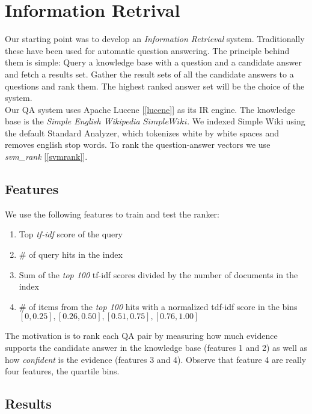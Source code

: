 \section{Information Retrival}
Our starting point was to develop an \emph{Information Retrieval} system. Traditionally these have been used for automatic question answering. The principle behind them is simple: Query a knowledge base with a question and a candidate answer and fetch a results set.  Gather the result sets of all the candidate answers to a questions and rank them. The highest ranked answer set will be the choice of the system.\\

Our QA system uses Apache Lucene [\ref{lucene}] as its IR engine. The knowledge base is the \emph{Simple English Wikipedia \(Simple Wiki\)}. We indexed Simple Wiki using the default Standard Analyzer, which tokenizes white by white spaces and removes english stop words. To rank the question-answer vectors we use \emph{svm\_rank} [\ref{svmrank}].

\subsection{Features}

We use the following features to train and test the ranker:

\begin{enumerate}
\item Top \emph{tf-idf} score of the query
\item \# of query hits in the index
\item Sum of the \emph{top 100} tf-idf scores divided by the number of documents in the index
\item \# of items from the \emph{top 100} hits with a normalized tdf-idf score in the bins $[0, 0.25], [0.26, 0.50], [0.51, 0.75],  [0.76, 1.00]$
\end{enumerate}

The motivation is to rank each QA pair by measuring how much evidence supports the candidate answer in the knowledge base (features 1 and 2) as well as how \emph{confident} is the evidence (features 3 and 4). Observe that feature 4 are really four features, the quartile bins.\\

\subsection{Results}


